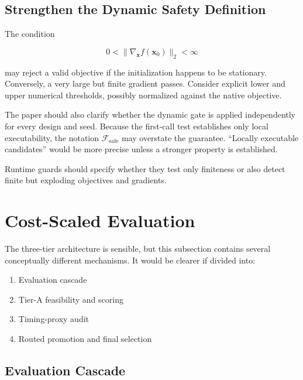 \documentclass[11pt]{article}
\begin{document}
\subsection{Strengthen the Dynamic Safety Definition}

The condition

\[
0<\|\nabla_{\mathbf{x}}f(\mathbf{x}_0)\|_2<\infty
\]

may reject a valid objective if the initialization happens to be stationary.
Conversely, a very large but finite gradient passes. Consider explicit lower
and upper numerical thresholds, possibly normalized against the native
objective.

The paper should also clarify whether the dynamic gate is applied independently
for every design and seed. Because the first-call test establishes only local
executability, the notation $\mathcal F_{\mathrm{safe}}$ may overstate the
guarantee. ``Locally executable candidates'' would be more precise unless a
stronger property is established.

Runtime guards should specify whether they test only finiteness or also detect
finite but exploding objectives and gradients.

\section{Cost-Scaled Evaluation}

The three-tier architecture is sensible, but this subsection contains several
conceptually different mechanisms. It would be clearer if divided into:

\begin{enumerate}
  \item Evaluation cascade
  \item Tier-A feasibility and scoring
  \item Timing-proxy audit
  \item Routed promotion and final selection
\end{enumerate}

\subsection{Evaluation Cascade}
\end{document}
